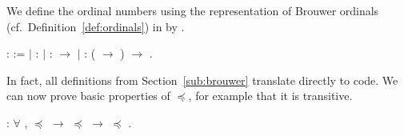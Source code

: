 We define the ordinal numbers using the representation of Brouwer
ordinals (cf.~Definition~\ref{def:ordinals}) in \Coq by
.
\begin{singlespace}
\begin{coqdoccode}
\coqdocnoindent
{}  :
 :=\coqdoceol
\coqdocindent{1.00em}
\ensuremath{|}   :
\coqdoceol
\coqdocindent{1.00em}
\ensuremath{|}   :
 \ensuremath{\rightarrow}
\coqdoceol
\coqdocindent{1.00em}
\ensuremath{|}  :
(
\ensuremath{\rightarrow} )
\ensuremath{\rightarrow}
.\coqdoceol
\end{coqdoccode}
\end{singlespace}
In fact, all definitions from Section~\ref{sub:brouwer} translate directly to
\Coq code. We can now prove basic properties of $\preceq$, for example that it
is transitive.
\begin{singlespace}
\begin{coqdoccode}
\coqdocnoindent
{}
:
\ensuremath{\forall} \coqdocvar{\ensuremath{\alpha}}
\coqdocvar{\ensuremath{\beta}}
\coqdocvar{\ensuremath{\gamma}}, \coqdocvariable{\ensuremath{\alpha}}
\ensuremath{\preceq} \coqdocvariable{\ensuremath{\beta}}
\ensuremath{\rightarrow}
\coqdocvariable{\ensuremath{\beta}} \ensuremath{\preceq}
\coqdocvariable{\ensuremath{\gamma}}
\ensuremath{\rightarrow} \coqdocvariable{\ensuremath{\alpha}}
\ensuremath{\preceq}
\coqdocvariable{\ensuremath{\gamma}}.\coqdoceol
\end{coqdoccode}
\end{singlespace}


